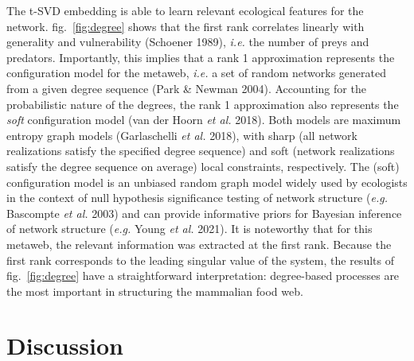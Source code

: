 \documentclass[10pt,oneside]{article}
\begin{document}
The t-SVD embedding is able to learn relevant ecological features for
the network. fig.~\ref{fig:degree} shows that the first rank correlates
linearly with generality and vulnerability (Schoener 1989), \emph{i.e.}
the number of preys and predators. Importantly, this implies that a rank
1 approximation represents the configuration model for the metaweb,
\emph{i.e.} a set of random networks generated from a given degree
sequence (Park \& Newman 2004). Accounting for the probabilistic nature
of the degrees, the rank 1 approximation also represents the \emph{soft}
configuration model (van der Hoorn \emph{et al.} 2018). Both models are
maximum entropy graph models (Garlaschelli \emph{et al.} 2018), with
sharp (all network realizations satisfy the specified degree sequence)
and soft (network realizations satisfy the degree sequence on average)
local constraints, respectively. The (soft) configuration model is an
unbiased random graph model widely used by ecologists in the context of
null hypothesis significance testing of network structure (\emph{e.g.}
Bascompte \emph{et al.} 2003) and can provide informative priors for
Bayesian inference of network structure (\emph{e.g.} Young \emph{et al.}
2021). It is noteworthy that for this metaweb, the relevant information
was extracted at the first rank. Because the first rank corresponds to
the leading singular value of the system, the results of
fig.~\ref{fig:degree} have a straightforward interpretation:
degree-based processes are the most important in structuring the
mammalian food web.

\hypertarget{discussion}{%
\section{Discussion}\label{discussion}}
\end{document}
